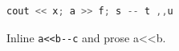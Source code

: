 \documentclass{article}
\begin{document}
\begin{lstlisting}[language=C++]
cout << x; a >> f; s -- t ,,u
\end{lstlisting}
Inline \lstinline|a<<b--c| and prose a<<b.
\end{document}
